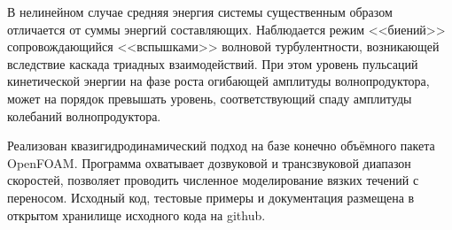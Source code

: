 В нелинейном случае средняя энергия системы существенным образом отличается от суммы энергий составляющих. Наблюдается режим <<биений>> сопровождающийся <<вспышками>> волновой турбулентности, возникающей вследствие каскада триадных взаимодействий. При этом уровень пульсаций кинетической
энергии на фазе роста огибающей амплитуды волнопродуктора, может на порядок превышать уровень, соответствующий спаду амплитуды колебаний волнопродуктора.


Реализован квазигидродинамический подход на базе конечно объёмного пакета OpenFOAM. Программа охватывает дозвуковой и трансзвуковой диапазон скоростей, позволяет проводить численное моделирование вязких течений с переносом. Исходный код, тестовые примеры и документация размещена в открытом хранилище исходного кода на github. 